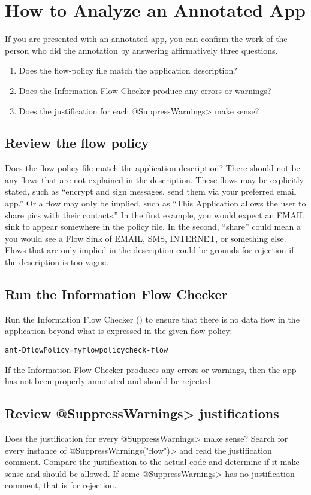 \htmlhr
\chapter{How to Analyze an Annotated App\label{analyze-annotated-app}}

If you are presented with an annotated app, you can confirm the work of the
person who did the annotation by answering affirmatively three questions.

\begin{enumerate}
\item Does the flow-policy file match the application description?
\item Does the Information Flow Checker produce any errors or warnings?
\item Does the justification for each \<@SuppressWarnings> make sense?
\end{enumerate}

\section{Review the flow policy}
Does the flow-policy file match the application description? There should
not be any flows that are not explained in the description.  These flows
may be explicitly stated, such as ``encrypt and sign messages, send them
via your preferred email app.''  Or a flow may only be implied, such as
``This Application allows the user to share pics with their contacts.''  In
the first example, you would expect an EMAIL sink to appear somewhere in
the policy file. In the second, ``share'' could mean a you would see a Flow
Sink of EMAIL, SMS, INTERNET, or something else.  Flows that are only
implied in the description could be grounds for rejection if the
description is too vague.

\section{Run the Information Flow Checker}

Run the Information Flow Checker () to ensure that there is no
data flow in the application beyond what is expressed in the given flow
policy:

\begin{alltt}
ant -DflowPolicy=myflowpolicy check-flow
\end{alltt}

If the Information Flow Checker produces any errors or warnings, then the app has not
been properly annotated and should be rejected.



\section{Review \<@SuppressWarnings> justifications}
Does the justification for every \<@SuppressWarnings> make sense? Search
for every instance of \<@SuppressWarnings("flow")> and read the
justification comment.  Compare the justification to the actual code and
determine if it make sense and should be allowed.  If some \<@SuppressWarnings> has
no justification comment, that is for rejection.
  

